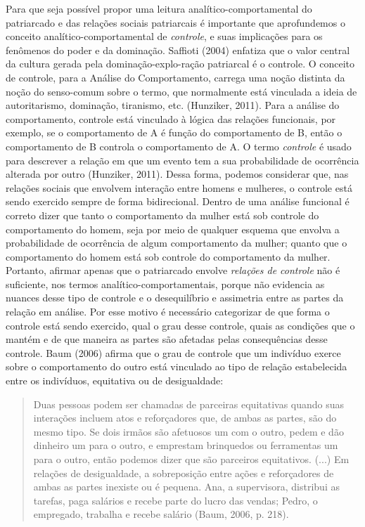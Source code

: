 Para que seja possível propor uma leitura analítico-comportamental do patriarcado e das relações sociais patriarcais é importante que aprofundemos o conceito analítico-comportamental de \textit{controle}, e suas implicações para os fenômenos do poder e da dominação. Saffioti (2004) enfatiza que o valor central da cultura gerada pela dominação-explo-\linebreak ração patriarcal é o controle. O conceito de controle, para a Análise do Comportamento, carrega uma noção distinta da noção do senso-comum sobre o termo, que normalmente está vinculada a ideia de autoritarismo, dominação, tiranismo, etc. (Hunziker, 2011). Para a análise do comportamento, controle está vinculado à lógica das relações funcionais, por exemplo, se o comportamento de A é função do comportamento de B, então o comportamento de B controla o comportamento de A. O termo \textit{controle} é usado para descrever a relação em que um evento tem a sua probabilidade de ocorrência alterada por outro (Hunziker, 2011). Dessa forma, podemos considerar que, nas relações sociais que envolvem interação entre homens e mulheres, o controle está sendo exercido sempre de forma bidirecional. Dentro de uma análise funcional é correto dizer que tanto o comportamento da mulher está sob controle do comportamento do homem, seja por meio de qualquer esquema que envolva a probabilidade de ocorrência de algum comportamento da mulher; quanto que o comportamento do homem está sob controle do comportamento da mulher. Portanto, afirmar apenas que o patriarcado envolve \textit{relações de controle} não é suficiente, nos termos analítico-comportamentais, porque não evidencia as nuances desse tipo de controle e o desequilíbrio e assimetria entre as partes da relação em análise. Por esse motivo é necessário categorizar de que forma o controle está sendo exercido, qual o grau desse controle, quais as condições que o mantém e de que maneira as partes são afetadas pelas consequências desse controle. Baum (2006) afirma que o grau de controle que um indivíduo exerce sobre o comportamento do outro está vinculado ao tipo de relação estabelecida entre os indivíduos, equitativa ou de desigualdade:

\begin{quote}
    Duas pessoas podem ser chamadas de parceiras equitativas quando suas interações incluem atos e reforçadores que, de ambas as partes, são do mesmo tipo. Se dois irmãos são afetuosos um com o outro, pedem e dão dinheiro um para o outro, e emprestam brinquedos ou ferramentas um para o outro, então podemos dizer que são parceiros equitativos. (...) Em relações de desigualdade, a sobreposição entre ações e reforçadores de ambas as partes inexiste ou é pequena. Ana, a supervisora, distribui as tarefas, paga salários e recebe parte do lucro das vendas; Pedro, o empregado, trabalha e recebe salário (Baum, 2006, p. 218).
\end{quote}

